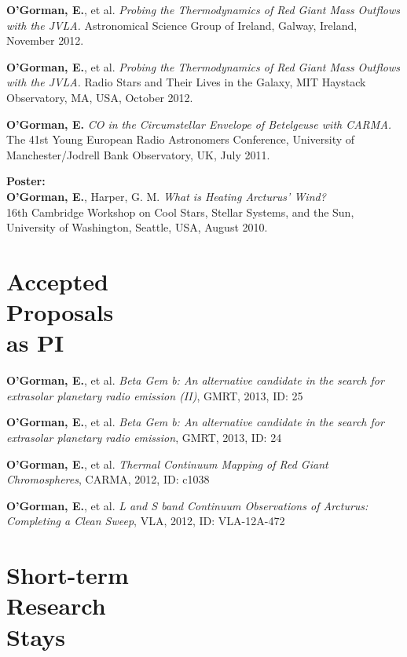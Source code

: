 \documentclass[margin,line]{resume}
\begin{document}
\begin{resume}
	\textbf{O'Gorman, E.}, et al. \textit{Probing the Thermodynamics of Red Giant Mass Outflows with the JVLA.}
Astronomical Science Group of Ireland, Galway, Ireland, November 2012. %
    
\textbf{O'Gorman, E.}, et al. \textit{Probing the Thermodynamics of Red Giant Mass Outflows with the JVLA.}
Radio Stars and Their Lives in the Galaxy, MIT Haystack Observatory, MA, USA, October 2012. %

\textbf{O'Gorman, E.} \textit{CO in the Circumstellar Envelope of Betelgeuse with CARMA.}
The 41st Young European Radio Astronomers Conference, University of Manchester/Jodrell Bank Observatory, UK, July 2011.

    \textbf{Poster:} \vspace{2mm}\\\vspace{1mm}%
    \textbf{O'Gorman, E.}, Harper, G. M. \textit{What is Heating Arcturus' Wind?}\\
16th Cambridge Workshop on Cool Stars, Stellar Systems, and the Sun, University of Washington, Seattle, USA, August 2010.


    \section{\mysidestyle Accepted\\Proposals\\as PI}

\textbf{O'Gorman, E.}, et al. \textit{Beta Gem b: An alternative candidate in the search for extrasolar planetary radio emission (II)}, GMRT, 2013, ID: 25%

\textbf{O'Gorman, E.}, et al. \textit{Beta Gem b: An alternative candidate in the search for extrasolar planetary radio emission}, GMRT, 2013, ID: 24%

\textbf{O'Gorman, E.}, et al. \textit{Thermal Continuum Mapping of Red Giant Chromospheres}, CARMA, 2012, ID: c1038%

\textbf{O'Gorman, E.}, et al. \textit{L and S band Continuum Observations of Arcturus: Completing a Clean Sweep}, VLA, 2012, ID: VLA-12A-472%

    \section{\mysidestyle Short-term\\Research\\Stays}


\end{resume}
\end{document}
